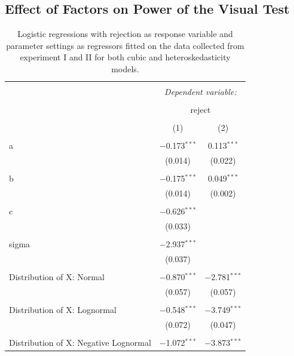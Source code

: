 \documentclass{monashthesis}
\theoremstyle{definition}
\theoremstyle{definition}
\theoremstyle{definition}
\theoremstyle{definition}
\theoremstyle{remark}
\begin{document}
\hypertarget{effect-of-factors-on-power-of-the-visual-test}{%
\subsection{Effect of Factors on Power of the Visual Test}\label{effect-of-factors-on-power-of-the-visual-test}}

\begin{table}[!htbp] \centering 
  \caption{Logistic regressions with rejection as response variable and parameter settings as regressors fitted on the data collected from experiment I and II for both cubic and heteroskedasticity models.} 
  \label{tab:rejectfactor} 
\begin{tabular}{@{\extracolsep{5pt}}lcc} 
\\[-1.8ex]\hline 
\hline \\[-1.8ex] 
 & \multicolumn{2}{c}{\textit{Dependent variable:}} \\ 
\cline{2-3} 
\\[-1.8ex] & \multicolumn{2}{c}{reject} \\ 
\\[-1.8ex] & (1) & (2)\\ 
\hline \\[-1.8ex] 
 a & $-$0.173$^{***}$ & 0.113$^{***}$ \\ 
  & (0.014) & (0.022) \\ 
  & & \\ 
 b & $-$0.175$^{***}$ & 0.049$^{***}$ \\ 
  & (0.014) & (0.002) \\ 
  & & \\ 
 c & $-$0.626$^{***}$ &  \\ 
  & (0.033) &  \\ 
  & & \\ 
 sigma & $-$2.937$^{***}$ &  \\ 
  & (0.037) &  \\ 
  & & \\ 
 Distribution of X: Normal & $-$0.870$^{***}$ & $-$2.781$^{***}$ \\ 
  & (0.057) & (0.057) \\ 
  & & \\ 
 Distribution of X: Lognormal & $-$0.548$^{***}$ & $-$3.749$^{***}$ \\ 
  & (0.072) & (0.047) \\ 
  & & \\ 
 Distribution of X: Negative Lognormal & $-$1.072$^{***}$ & $-$3.873$^{***}$ \\ 

\end{tabular}
\end{table}
\end{document}
